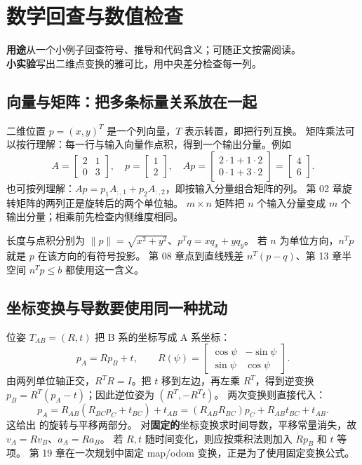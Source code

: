 \chapter{数学回查与数值检查}
\begin{notebox}
\textbf{用途}\quad 从一个小例子回查符号、推导和代码含义；可随正文按需阅读。\\
\textbf{小实验}\quad 写出二维点变换的雅可比，用中央差分检查每一列。
\end{notebox}
\section{向量与矩阵：把多条标量关系放在一起}
二维位置 $p=(x,y)^T$ 是一个列向量，$T$ 表示转置，即把行列互换。
矩阵乘法可以按行理解：每一行与输入向量作点积，得到一个输出分量。例如
\[
 A=\begin{bmatrix}2&1\\0&3\end{bmatrix},\quad
 p=\begin{bmatrix}1\\2\end{bmatrix},\quad
 Ap=\begin{bmatrix}2\cdot1+1\cdot2\\0\cdot1+3\cdot2\end{bmatrix}
 =\begin{bmatrix}4\\6\end{bmatrix}.
\]
也可按列理解：$Ap=p_1A_{:,1}+p_2A_{:,2}$，即按输入分量组合矩阵的列。
第 02 章旋转矩阵的两列正是旋转后的两个单位轴。
$m\times n$ 矩阵把 $n$ 个输入分量变成 $m$ 个输出分量；相乘前先检查内侧维度相同。

长度与点积分别为 $\|p\|=\sqrt{x^2+y^2}$、$p^Tq=xq_x+yq_y$。
若 $n$ 为单位方向，$n^Tp$ 就是 $p$ 在该方向的有符号投影。
第 08 章点到直线残差 $n^T(p-q)$、第 13 章半空间 $n^Tp\le b$ 都使用这一含义。

\section{坐标变换与导数要使用同一种扰动}
位姿 $T_{AB}=(R,t)$ 把 B 系的坐标写成 A 系坐标：
\[
 p_A=Rp_B+t,\qquad
 R(\psi)=\begin{bmatrix}\cos\psi&-\sin\psi\\\sin\psi&\cos\psi\end{bmatrix}.
\]
由两列单位轴正交，$R^TR=I$。把 $t$ 移到左边，再左乘 $R^T$，得到逆变换
$p_B=R^T(p_A-t)$；因此逆位姿为 $(R^T,-R^Tt)$。
两次变换则直接代入：
\[
 p_A=R_{AB}(R_{BC}p_C+t_{BC})+t_{AB}
      =(R_{AB}R_{BC})p_C+R_{AB}t_{BC}+t_{AB}.
\]
这给出  的旋转与平移两部分。
对\textbf{固定的}坐标变换求时间导数，平移常量消失，故 $v_A=Rv_B$、$a_A=Ra_B$。
若 $R,t$ 随时间变化，则应按乘积法则加入 $\dot R p_B$ 和 $\dot t$ 等项。
第 19 章在一次规划中固定 map/odom 变换，正是为了使用固定变换公式。


